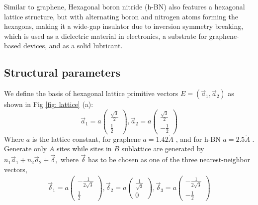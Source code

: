 Similar to graphene, Hexagonal boron nitride (\gls{h-BN}) also features a hexagonal lattice structure, but with alternating boron and nitrogen atoms forming the hexagons, making it a wide-gap insulator due to inversion symmetry breaking, which is used as a dielectric material in electronics, a substrate for graphene-based devices, and as a solid lubricant.
\subsection{Structural parameters}
 We define the basis of hexagonal lattice primitive vectors $E = (\vec{a}_{1}, \vec{a}_{2})$ as shown in Fig \ref{fig: lattice} (a):
$$
\vec{a}_{1}=a\left(\begin{array}{l}
\frac{\sqrt{3}}{2} \\
\frac{1}{2}
\end{array}\right),
\vec{a}_{2}=a\left(\begin{array}{l}
\frac{\sqrt{3}}{2} \\
-\frac{1}{2}
\end{array}\right)
$$
Where $a$ is the lattice constant, for graphene $a= 1.42 \mathring{A}$ \cite{sarma2011electronic}, and for \gls{h-BN} $a= 2.5 \mathring{A}$ \cite{PhysRevB.81.155433}. Generate only $A$ sites while sites in $B$ sublattice are generated by $n_{1} \vec{a}_{1}+n_{2} \vec{a}_{2}+\vec{\delta},$ where $\vec{\delta}$ has to be chosen as one of the three nearest-neighbor vectors,
$$
\begin{array}{c}
\vec{\delta}_{1}=a\left(\begin{array}{l}
-\frac{1}{2 \sqrt{3}}\\ \frac{1}{2}\end{array}\right), 
\vec{\delta}_{2}=a\left(\begin{array}{l}\frac{1}{\sqrt{3}}\\ 0 \end{array}\right),
\vec{\delta}_{3}=a\left(\begin{array}{l} -\frac{1}{2 \sqrt{3}}\\ -\frac{1}{2}\end{array}\right)
\end{array}
$$
